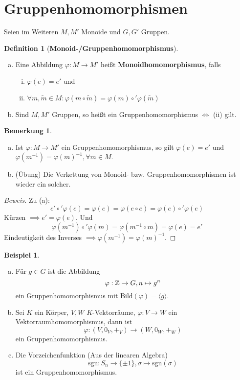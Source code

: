 \documentclass[a4paper]{report}
\theoremstyle{plain}
\theoremstyle{definition}
\newtheorem{defi}[thm]{Definition}
\newtheorem{bem}[thm]{Bemerkung}
\newtheorem{bsp}[thm]{Beispiel}
\begin{document}
\section{Gruppenhomomorphismen}%
\label{sec:Gruppenhomomorphismen}
Seien im Weiteren $M, M'$ Monoide und $G, G'$ Gruppen.
\begin{defi}[\textbf{Monoid-/Gruppenhomomorphismus}] \item
  \begin{enumerate}[(a)]
    \item Eine Abbildung $\varphi : M \to M'$ heißt \textbf{Monoidhomomorphismus}, falls
          \begin{enumerate}[(i)]
            \item $\varphi(e) = e'$ und
                  \item $\forall m , \tilde m \in M : \varphi(m \circ \tilde m) = \varphi(m) \circ' \varphi(\tilde m)$
          \end{enumerate}
          \item Sind $M, M'$ Gruppen, so heißt ein Gruppenhomomorphismus $\iff$ (ii) gilt.
  \end{enumerate}
\end{defi}
\begin{bem} \item
 \begin{enumerate}[(a)]
   \item Ist $\varphi : M \to M'$ ein Gruppenhomomorphismus, so gilt $\varphi(e)=e'$ und $\varphi(m^{-1}) = \varphi(m)^{-1}, \forall m \in M$.
         \item (Übung) Die Verkettung von Monoid- bzw. Gruppenhomomorphismen ist wieder ein solcher.
 \end{enumerate}
 \begin{proof}[Beweis]
Zu (a): $$e' \circ' \varphi(e) = \varphi(e) = \varphi(e \circ e) = \varphi(e) \circ' \varphi(e)$$
Kürzen $\implies e' = \varphi(e)$. Und $$\varphi(m^{-1})\circ' \varphi(m) = \varphi(m^{-1} \circ m) = \varphi(e) = e'$$
Eindeutigkeit des Inverses $\implies \varphi(m^{-1}) = \varphi(m)^{-1}$.
 \end{proof}
\end{bem}
\begin{bsp}
  \begin{enumerate}[(a)]
    \item Für $g \in G$ ist die Abbildung
          $$\varphi: \Bbb Z \to G, n \mapsto g^{n}$$
          ein Gruppenhomomorphismus mit $\mathrm{Bild}(\varphi) = \langle g \rangle$.
    \item Sei $K$ ein Körper, $V, W$ $K$-Vektorräume, $\varphi : V \to W$ ein Vektorraumhomomorphismus, dann ist
          $$\varphi : (V, 0_{V}, +_{V}) \to (W, 0_{W}, +_{W})$$
          ein Gruppenhomomorphismus.
    \item Die Vorzeichenfunktion (Aus der linearen Algebra)
          $$\mathrm{sgn}: S_{n} \to \{\pm 1\}, \sigma \mapsto \mathrm{sgn}(\sigma)$$
          ist ein Gruppenhomomorphismus.
  \end{enumerate}
\end{bsp}
\end{document}
